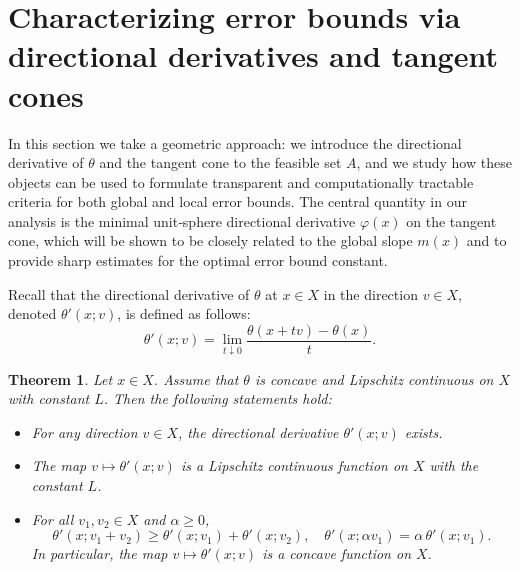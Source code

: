 \documentclass[11pt]{article}
\newtheorem{theorem}{Theorem}[section]
\begin{document}
 \section{Characterizing error bounds via directional derivatives and tangent cones}

In this section we take a  geometric approach: we introduce the directional derivative of \(\theta\) and the tangent cone to the feasible set \(A\), and we study how these objects can be used to formulate transparent and computationally tractable criteria for both global and local error bounds. 
The central quantity in our analysis is the minimal unit‑sphere directional derivative \(\varphi(x)\) on the tangent cone, which will be shown to be closely related to the global slope \(m(x)\) and to provide sharp estimates for the optimal error bound constant.

Recall that the directional derivative of \(\theta\) at \( x \in X \) in the direction \( v \in X \), denoted \(\theta'(x;v)\), is defined as follows:
\[
\theta'(x;v) = \lim_{t \downarrow 0} \frac{\theta (x + tv) - \theta (x)}{t}.
\]


\begin{theorem}  \label{JBXZDS} 
	Let $x \in X$.	Assume that  $\theta$ is concave and   Lipschitz continuous on $X$ with constant $L$.
	Then	the following statements hold:
	\begin{itemize}
		\item[(i)]  For   any direction $v \in X$, the directional derivative  $	\theta'(x; v)$  exists. 
		\item[(ii)] The map $v \mapsto \theta'( x; v)$ is a Lipschitz continuous   function on $X$ with the   constant $L$.
		\item[(iii)] For all $v_1, v_2 \in X$ and $\alpha \ge 0$,
		\[
		\theta'(x; v_1+v_2) \ge \theta'( x; v_1) + \theta'( x; v_2), \quad
		\theta'( x; \alpha v_1) = \alpha \,\theta'( x; v_1).
		\]
		In		particular,   the map $v \mapsto \theta'( x; v)$ is a   concave function on $X$.
	\end{itemize}
\end{theorem}
\end{document}
